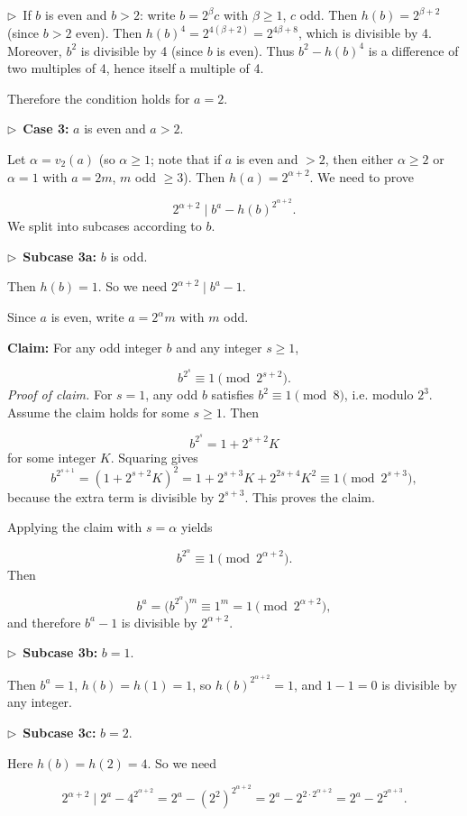 \documentclass{llmxive}
\providecommand{\compactbullet}[1]{\par\noindent$\triangleright$~#1\par}
\begin{document}
\compactbullet{If \(b\) is even and \(b>2\): write \(b=2^{\beta}c\) with \(\beta\ge1\), \(c\) odd. Then \(h(b)=2^{\beta+2}\) (since \(b>2\) even). Then \(h(b)^{4}=2^{4(\beta+2)}=2^{4\beta+8}\), which is divisible by 4. Moreover, \(b^{2}\) is divisible by 4 (since \(b\) is even). Thus \(b^{2}-h(b)^{4}\) is a difference of two multiples of 4, hence itself a multiple of 4.}
Therefore the condition holds for \(a=2\).\par
\compactbullet{\textbf{Case 3: }\(a\) is even and \(a>2\).\textbf{}}
Let \(\alpha = v_{2}(a)\) (so \(\alpha\ge1\); note that if \(a\) is even and \(>2\), then either \(\alpha\ge2\) or \(\alpha=1\) with \(a=2m\), \(m\) odd \(\ge3\)). Then \(h(a)=2^{\alpha+2}\). We need to prove\par
\[
  2^{\alpha+2} \mid b^{a} - h(b)^{2^{\alpha+2}}.
  \]
We split into subcases according to \(b\).\par
\compactbullet{\textbf{Subcase 3a: }\(b\) is odd.\textbf{}}
Then \(h(b)=1\). So we need \(2^{\alpha+2}\mid b^{a}-1\).\par
Since \(a\) is even, write \(a = 2^{\alpha} m\) with \(m\) odd.\par
\textbf{Claim:} For any odd integer \(b\) and any integer \(s\ge1\),\par
\[
    b^{2^{s}} \equiv 1 \pmod{2^{s+2}}.
    \]
\emph{Proof of claim.} For \(s=1\), any odd \(b\) satisfies \(b^{2}\equiv1\pmod8\), i.e. modulo \(2^{3}\). Assume the claim holds for some \(s\ge1\). Then\par
\[
    b^{2^{s}} = 1 + 2^{s+2} K
\]
for some integer \(K\). Squaring gives
\[
    b^{2^{s+1}} = (1 + 2^{s+2} K)^{2} = 1 + 2^{s+3} K + 2^{2s+4} K^{2} \equiv 1 \pmod{2^{s+3}},
\]
because the extra term is divisible by \(2^{s+3}\). This proves the claim.\par
Applying the claim with \(s=\alpha\) yields\par
\[
    b^{2^{\alpha}} \equiv 1 \pmod{2^{\alpha+2}}.
    \]
Then\par
\[
    b^{a} = \bigl(b^{2^{\alpha}}\bigr)^{m} \equiv 1^{m} = 1 \pmod{2^{\alpha+2}},
    \]
and therefore \(b^{a}-1\) is divisible by \(2^{\alpha+2}\).\par
\compactbullet{\textbf{Subcase 3b: }\(b=1\).\textbf{}}
Then \(b^{a}=1\), \(h(b)=h(1)=1\), so \(h(b)^{2^{\alpha+2}}=1\), and \(1-1=0\) is divisible by any integer.\par
\compactbullet{\textbf{Subcase 3c: }\(b=2\).\textbf{}}
Here \(h(b)=h(2)=4\). So we need\par
\[
    2^{\alpha+2} \mid 2^{a} - 4^{2^{\alpha+2}} = 2^{a} - (2^{2})^{2^{\alpha+2}} = 2^{a} - 2^{2\cdot 2^{\alpha+2}} = 2^{a} - 2^{2^{\alpha+3}}.
    \]
\end{document}
